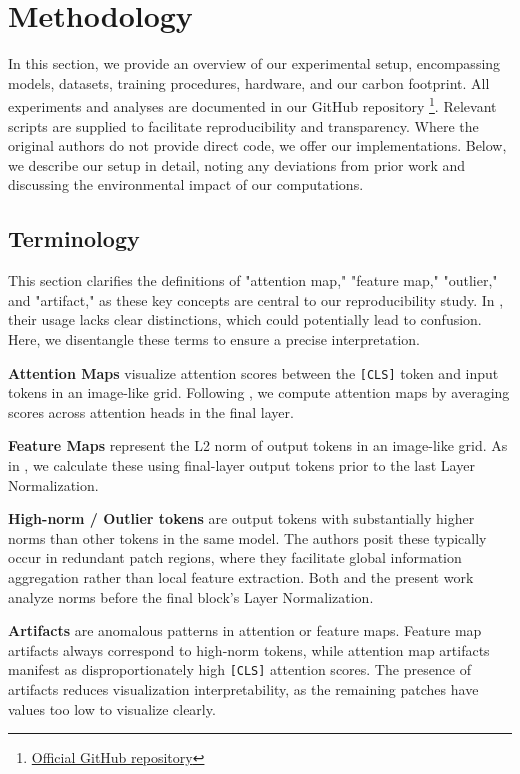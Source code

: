 \documentclass[10pt]{article} %
\begin{document}
\section{Methodology}
In this section, we provide an overview of our experimental setup, encompassing models, datasets, training procedures, hardware, and our carbon footprint. All experiments and analyses are documented in our GitHub repository \footnote{\href{https://anonymous.4open.science/r/VitReg-4C8B/}{Official GitHub repository}}. Relevant scripts are supplied to facilitate reproducibility and transparency. Where the original authors do not provide direct code, we offer our implementations. Below, we describe our setup in detail, noting any deviations from prior work and discussing the environmental impact of our computations.

\subsection{Terminology}
This section clarifies the definitions of "attention map," "feature map," "outlier," and "artifact," as these key concepts are central to our reproducibility study. In \citet{darcet2024registers}, their usage lacks clear distinctions, which could potentially lead to confusion.
Here, we disentangle these terms to ensure a precise interpretation.

\textbf{Attention Maps} visualize attention scores between the \texttt{[CLS]} token and input tokens in an image-like grid. Following \citet{darcet2024registers}, we compute attention maps by averaging scores across attention heads in the final layer.

\textbf{Feature Maps} represent the L2 norm of output tokens in an image-like grid. As in \citet{darcet2024registers}, we calculate these using final-layer output tokens prior to the last Layer Normalization.

\textbf{High-norm / Outlier tokens} are output tokens with substantially higher norms than other tokens in the same model. The authors posit these typically occur in redundant patch regions, where they facilitate global information aggregation rather than local feature extraction. Both \citet{darcet2024registers} and the present work analyze norms before the final block's Layer Normalization.

\textbf{Artifacts} are anomalous patterns in attention or feature maps. Feature map artifacts always correspond to high-norm tokens, while attention map artifacts manifest as disproportionately high \texttt{[CLS]} attention scores. The presence of artifacts reduces visualization interpretability, as the remaining patches have values too low to visualize clearly.
\end{document}
